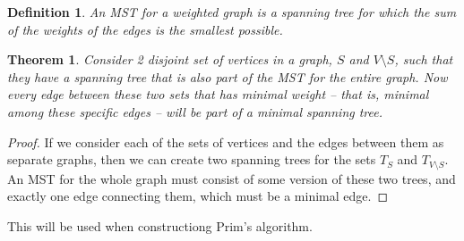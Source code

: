 \documentclass{article}
\newtheorem{definition}{Definition}
\newtheorem{theorem}{Theorem}
\begin{document}
    \begin{definition}
        An MST for a weighted graph is a spanning tree for which the sum of the
        weights of the edges is the smallest possible.
    \end{definition}

    \begin{theorem}
        Consider 2 disjoint set of vertices in a graph, $S$ and $V \setminus
        S$, such that they have a spanning tree that is also part of the MST
        for the entire graph. Now every edge between these two sets that has
        minimal weight – that is, minimal among these specific edges – will be
        part of a minimal spanning tree.
    \end{theorem}

    \begin{proof}
        If we consider each of the sets of vertices and the edges between them
        as separate graphs, then we can create two spanning trees for the sets
        $T_S$ and $T_{V \setminus S}$. An MST for the whole graph must consist
        of some version of these two trees, and exactly one edge connecting
        them, which must be a minimal edge.
    \end{proof}

    This will be used when constructiong Prim's algorithm.

 


\end{document}
